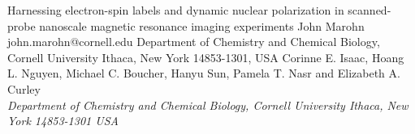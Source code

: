 \begin{conf-abstract}[]
{Harnessing electron-spin labels and dynamic nuclear polarization in scanned-probe nanoscale magnetic resonance imaging experiments}
{\color{blue} John Marohn}
{john.marohn@cornell.edu}
{Department of Chemistry and Chemical Biology, Cornell University Ithaca, New York 14853-1301, USA}
{{\color{blue}Corinne E. Isaac, Hoang L. Nguyen, Michael C. Boucher, Hanyu Sun, Pamela T. Nasr and Elizabeth A. Curley}\\ \textit{Department of Chemistry and Chemical Biology, Cornell University Ithaca, New York 14853-1301 USA}\\ 
\decofourleft \decofourright}





\printbibliography[heading=none]

\end{conf-abstract}
